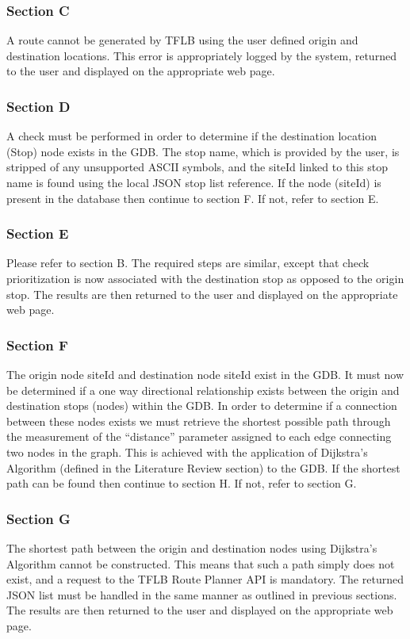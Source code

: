 \documentclass[12pt]{article}   	%
\begin{document}
\subsubsection{Section C}
A route cannot be generated by TFLB using the user defined origin and destination locations. This error is appropriately logged by the system, returned to the user and displayed on the appropriate web page.

\subsubsection{Section D}
A check must be performed in order to determine if the destination location (Stop) node exists in the GDB. The stop name, which is provided by the user, is stripped of any unsupported ASCII symbols, and the siteId linked to this stop name is found using the local JSON stop list reference. If the node (siteId) is present in the database then continue to section F. If not, refer to section E.

\subsubsection{Section E}
Please refer to section B. The required steps are similar, except that check prioritization is now associated with the destination stop as opposed to the origin stop. The results are then returned to the user and displayed on the appropriate web page.

\subsubsection{Section F}
The origin node siteId and destination node siteId exist in the GDB. It must now be determined if a one way directional relationship exists between the origin and destination stops (nodes) within the GDB. In order to determine if a connection between these nodes exists we must retrieve the shortest possible path through the measurement of the “distance” parameter assigned to each edge connecting two nodes in the graph. This is achieved with the application of Dijkstra’s Algorithm (defined in the Literature Review section) to the GDB. If the shortest path can be found then continue to section H. If not, refer to section G.

\subsubsection{Section G}
The shortest path between the origin and destination nodes using Dijkstra’s Algorithm cannot be constructed. This means that such a path simply does not exist, and a request to the TFLB Route Planner API is mandatory. The returned JSON list must be handled in the same manner as outlined in previous sections. The results are then returned to the user and displayed on the appropriate web page.
\end{document}
